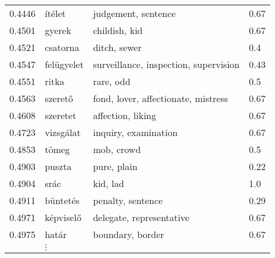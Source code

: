 \documentclass[11pt]{article}
\begin{document}
\begin{table*}
\begin{tabular}{llll}
0.4446	& ítélet	& judgement, sentence	& 0.67 \\
0.4501	& gyerek	& childish, kid	& 0.67 \\
0.4521	& csatorna	& ditch, sewer	& 0.4 \\
0.4547	& felügyelet	& surveillance, inspection, supervision	& 0.43 \\
0.4551	& ritka	& rare, odd	& 0.5 \\
0.4563	& szerető	& fond, lover, affectionate, mistress	& 0.67 \\
0.4608	& szeretet	& affection, liking	& 0.67 \\
0.4723	& vizsgálat	& inquiry, examination	& 0.67 \\
0.4853	& tömeg	& mob, crowd	& 0.5 \\
0.4903	& puszta	& pure, plain	& 0.22 \\
0.4904	& srác	& kid, lad	& 1.0 \\
0.4911	& büntetés	& penalty, sentence	& 0.29 \\
0.4971	& képviselő	& delegate, representative	& 0.67 \\
0.4975	& határ	& boundary, border	& 0.67 \\
    &$\vdots$ \\

\end{tabular}
\end{table*}
\end{document}
